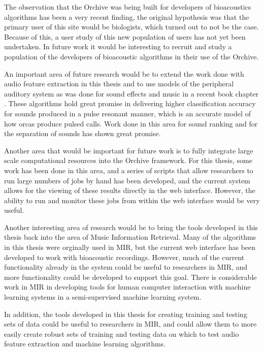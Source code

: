 \documentclass[12pt,oneside]{book}
\begin{document}
The observation that the Orchive was being built for developers of
bioacoustics algorithms has been a very recent finding, the original
hypothesis was that the primary user of this site would be biologists,
which turned out to not be the case.  Because of this, a user study of
this new population of users has not yet been undertaken.  In future
work it would be interesting to recruit and study a population of the
developers of bioacoustic algorithms in their use of the Orchive.

An important area of future research would be to extend the work done
with audio feature extraction in this thesis and to use models of the
peripheral auditory system as was done for sound effects and music in
a recent book chapter \cite{ness2010sparse}.  These algorithms hold
great promise in delivering higher classification accuracy for sounds
produced in a pulse resonant manner, which is an accurate model of how
orcas produce pulsed calls.  Work done in this area for sound ranking
\cite{rehn2009sparse} and for the separation of sounds
\cite{duda1990correlograms} has shown great promise.

Another area that would be important for future work is to fully
integrate large scale computational resources into the Orchive
framework.  For this thesis, some work has been done in this area, and
a series of scripts that allow researchers to run large numbers of
jobs by hand has been developed, and the current system allows for the
viewing of these results directly in the web interface.  However, the
ability to run and monitor these jobs from within the web interface
would be very useful.  

Another interesting area of research would be to bring the tools
developed in this thesis back into the area of Music Information
Retrieval.  Many of the algorithms in this thesis were orginally used
in MIR, but the current web interface has been developed to work with
bioacoustic recordings.  However, much of the current functionality
already in the system could be useful to researchers in MIR, and more
functionality could be developed to support this goal.  There is
considerable work in MIR in developing tools for human computer
interaction with machine learning systems in a semi-supervised machine
learning system.  

In addition, the tools developed in this thesis for creating training
and testing sets of data could be useful to researchers in MIR, and
could allow them to more easily create robust sets of training and
testing data on which to test audio feature extraction and machine
learning algorithms.
\end{document}
